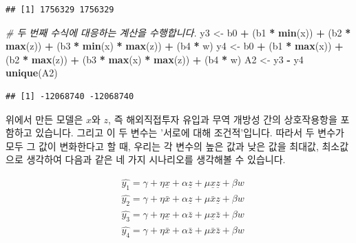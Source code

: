 \documentclass[
]{book}
\newenvironment{Shaded}{\begin{snugshade}}{\end{snugshade}}
\newcommand{\CommentTok}[1]{\textcolor[rgb]{0.56,0.35,0.01}{\textit{#1}}}
\newcommand{\KeywordTok}[1]{\textcolor[rgb]{0.13,0.29,0.53}{\textbf{#1}}}
\newcommand{\NormalTok}[1]{#1}
\newcommand{\OperatorTok}[1]{\textcolor[rgb]{0.81,0.36,0.00}{\textbf{#1}}}
\newcommand{\StringTok}[1]{\textcolor[rgb]{0.31,0.60,0.02}{#1}}
\begin{document}
\begin{verbatim}
## [1] 1756329 1756329
\end{verbatim}

\begin{Shaded}
\begin{Highlighting}[]
\CommentTok{# 두 번째 수식에 대응하는 계산을 수행합니다.}
\NormalTok{y3 <-}\StringTok{ }\NormalTok{b0 }\OperatorTok{+}\StringTok{ }\NormalTok{(b1 }\OperatorTok{*}\StringTok{ }\KeywordTok{min}\NormalTok{(x)) }\OperatorTok{+}\StringTok{ }\NormalTok{(b2 }\OperatorTok{*}\StringTok{ }\KeywordTok{max}\NormalTok{(z)) }\OperatorTok{+}
\StringTok{  }\NormalTok{(b3 }\OperatorTok{*}\StringTok{ }\KeywordTok{min}\NormalTok{(x) }\OperatorTok{*}\StringTok{ }\KeywordTok{max}\NormalTok{(z)) }\OperatorTok{+}\StringTok{ }\NormalTok{(b4 }\OperatorTok{*}\StringTok{ }\NormalTok{w)}
\NormalTok{y4 <-}\StringTok{ }\NormalTok{b0 }\OperatorTok{+}\StringTok{ }\NormalTok{(b1 }\OperatorTok{*}\StringTok{ }\KeywordTok{max}\NormalTok{(x)) }\OperatorTok{+}\StringTok{ }\NormalTok{(b2 }\OperatorTok{*}\StringTok{ }\KeywordTok{max}\NormalTok{(z)) }\OperatorTok{+}
\StringTok{  }\NormalTok{(b3 }\OperatorTok{*}\StringTok{ }\KeywordTok{max}\NormalTok{(x) }\OperatorTok{*}\StringTok{ }\KeywordTok{max}\NormalTok{(z)) }\OperatorTok{+}\StringTok{ }\NormalTok{(b4 }\OperatorTok{*}\StringTok{ }\NormalTok{w)}
\NormalTok{A2 <-}\StringTok{ }\NormalTok{y3 }\OperatorTok{-}\StringTok{ }\NormalTok{y4}
\KeywordTok{unique}\NormalTok{(A2)}
\end{Highlighting}
\end{Shaded}

\begin{verbatim}
## [1] -12068740 -12068740
\end{verbatim}

위에서 만든 모델은 \(x\)와 \(z\), 즉 해외직접투자 유입과 무역 개방성 간의 상호작용항을 포함하고 있습니다. 그리고 이 두 변수는 '서로에 대해 조건적'입니다. 따라서 두 변수가 모두 그 값이 변화한다고 할 때, 우리는 각 변수의 높은 값과 낮은 값을 최대값, 최소값으로 생각하여 다음과 같은 네 가지 시나리오를 생각해볼 수 있습니다.

\begin{equation*}
\begin{aligned}
&\hat{y_1} = \gamma + \eta \underline{x} + \alpha \underline{z} + \mu \underline{x}\underline{z} + \beta w\\
&\hat{y_2} = \gamma + \eta \bar{x} + \alpha \underline{z} + \mu \bar{x}\underline{z} + \beta w\\
&\hat{y_3} = \gamma + \eta \underline{x} + \alpha \bar{z} + \mu \underline{x}\bar{z} + \beta w\\
&\hat{y_4} = \gamma + \eta \bar{x} + \alpha \bar{z} + \mu \bar{x}\bar{z} + \beta w\\
\end{aligned}
\end{equation*}
\end{document}
